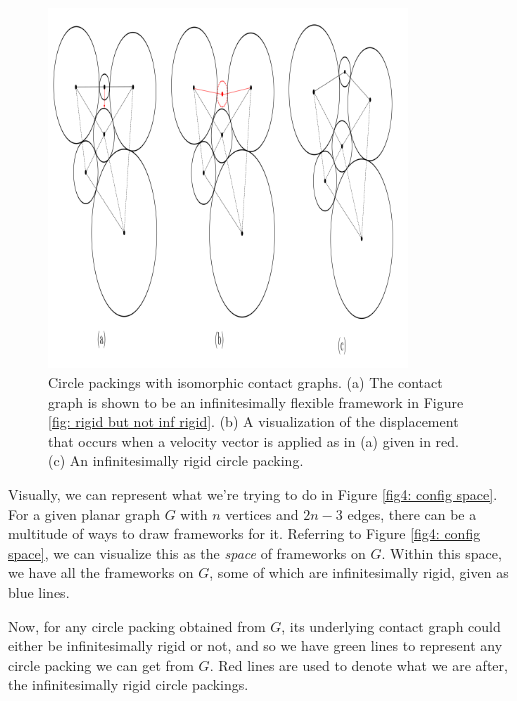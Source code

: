\begin{figure}[htbp]
    \centering
    \includegraphics[width = 0.85\textwidth]{Chapter 4/2. Isomorphic but not inf rigid.png}
    \caption{Circle packings with isomorphic contact graphs. (a) The contact graph is shown to be an infinitesimally flexible framework in Figure \ref{fig: rigid but not inf rigid}. (b) A visualization of the displacement that occurs when a velocity vector is applied as in (a) given in red. (c) An infinitesimally rigid circle packing.}
    \label{fig4: iso but not rig}
\end{figure}
\vspace{-3mm}
\begin{flushleft}
Visually, we can represent what we're trying to do in Figure \ref{fig4: config space}. For a given planar graph $G$ with $n$ vertices and $2n - 3$ edges, there can be a multitude of ways to draw frameworks for it. Referring to Figure \ref{fig4: config space}, we can visualize this as the \textit{space} of frameworks on $G$. Within this space, we have all the frameworks on $G$, some of which are infinitesimally rigid, given as blue lines.  
\end{flushleft}
    
\begin{flushleft}
Now, for any circle packing obtained from $G$, its underlying contact graph could either be infinitesimally rigid or not, and so we have green lines to represent any circle packing we can get from $G$. Red lines are used to denote what we are after, the infinitesimally rigid circle packings. 
\end{flushleft}
    
